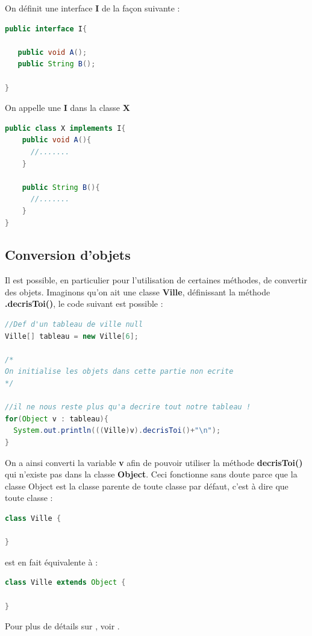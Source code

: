 \documentclass[a4paper,twoside]{article}
\begin{document}
On définit une interface \textbf{I} de la façon suivante :
\begin{lstlisting}[language=java]
public interface I{
 
   public void A();
   public String B();
 
}
\end{lstlisting}

On appelle une  \textbf{I} dans la classe \textbf{X}
\begin{lstlisting}[language=java]
public class X implements I{
    public void A(){
      //.......
    }
 
    public String B(){
      //.......
    }
}
\end{lstlisting}

\subsection{Conversion d'objets}
Il est possible, en particulier pour l'utilisation de certaines méthodes, de convertir des objets. Imaginons qu'on ait une classe \textbf{Ville}, définissant la méthode \textbf{.decrisToi()}, le code suivant est possible :
\begin{lstlisting}[language=java]
//Def d'un tableau de ville null
Ville[] tableau = new Ville[6];

/*
On initialise les objets dans cette partie non ecrite
*/

//il ne nous reste plus qu'a decrire tout notre tableau !
for(Object v : tableau){
  System.out.println(((Ville)v).decrisToi()+"\n");
}
\end{lstlisting}
On a ainsi converti la variable \textbf{v} afin de pouvoir utiliser la méthode \textbf{decrisToi()} qui n'existe pas dans la classe \textbf{Object}. Ceci fonctionne sans doute parce que la classe Object est la classe parente de toute classe par défaut, c'est à dire que toute classe :
\begin{lstlisting}[language=java]
class Ville {

}
\end{lstlisting}
est en fait équivalente à :
\begin{lstlisting}[language=java]
class Ville extends Object {

}
\end{lstlisting}

Pour plus de détails sur , voir .
\end{document}
